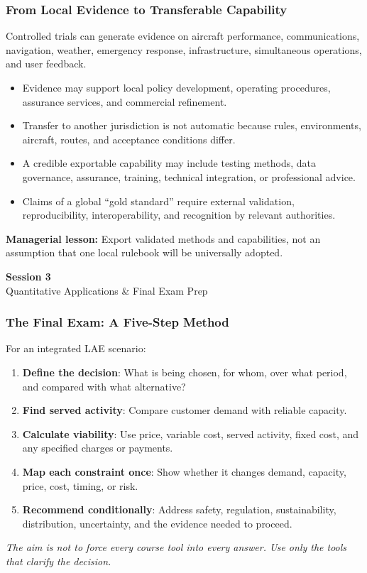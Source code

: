 \documentclass{beamer}
\begin{document}
\begin{frame}[t]
\frametitle{From Local Evidence to Transferable Capability}
Controlled trials can generate evidence on aircraft performance, communications, navigation, weather, emergency response, infrastructure, simultaneous operations, and user feedback.
\begin{itemize}
\item Evidence may support local policy development, operating procedures, assurance services, and commercial refinement.
\item Transfer to another jurisdiction is not automatic because rules, environments, aircraft, routes, and acceptance conditions differ.
\item A credible exportable capability may include testing methods, data governance, assurance, training, technical integration, or professional advice.
\item Claims of a global ``gold standard'' require external validation, reproducibility, interoperability, and recognition by relevant authorities.
\end{itemize}
\textbf{Managerial lesson:} Export validated methods and capabilities, not an assumption that one local rulebook will be universally adopted.
\end{frame}

\begin{frame}[c]
  \begin{center}
    \huge\color{cuhkpurple}\textbf{Session 3}\\
    \vspace{0.5cm}
    \Large Quantitative Applications \& Final Exam Prep
  \end{center}
\end{frame}

\begin{frame}[t]
\frametitle{The Final Exam: A Five-Step Method}
For an integrated LAE scenario:
\begin{enumerate}
\item \textbf{Define the decision}: What is being chosen, for whom, over what period, and compared with what alternative?
\item \textbf{Find served activity}: Compare customer demand with reliable capacity.
\item \textbf{Calculate viability}: Use price, variable cost, served activity, fixed cost, and any specified charges or payments.
\item \textbf{Map each constraint once}: Show whether it changes demand, capacity, price, cost, timing, or risk.
\item \textbf{Recommend conditionally}: Address safety, regulation, sustainability, distribution, uncertainty, and the evidence needed to proceed.
\end{enumerate}
\textit{The aim is not to force every course tool into every answer. Use only the tools that clarify the decision.}
\end{frame}
\end{document}
